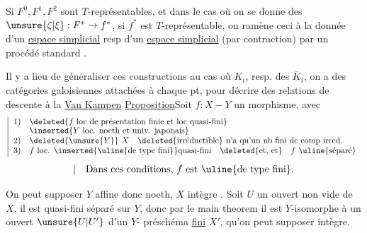 Si $F^0,F^1,F^2$ sont $T$-représentables, et dans le cas où on se donne
des $\unsure{\zeta|\xi}:F^*\to f^*$, si $f^*$ est $T$-représentable,
on ramène ceci à la donnée d'un  \uline{espace simplicial}
resp d'un \uline{espace simplicial}  (par contraction)
par un procédé standard \unsure{----}.

Il y a lieu de généraliser ces constructions au cas où
 $K_i$, resp. des $\overline K_i$, on a des catégories
galoisiennes attachées à chaque pt,
pour décrire des relations de descente à la
\uline{Van Kampen} \unsure{-----}
\uline{Proposition}\quad Soit $f:X-Y$ un morphisme, avec
\[
\left|
\begin{array}{ll}
1)&\deleted{f\text{ loc de présentation finie et loc quasi-fini}}\\[-.3ex]
 &\inserted{Y\text{ loc. noeth et univ. japonais}}\\
2)&\deleted{\unsure{Y}}\ X\quad\deleted{\text{irréductible}}\ 
\text{n'a qu'un nb fini de comp irred.}\\
3)&f\text{ loc. }\inserted{\uline{\text{de type fini}}}
\text{quasi-fini}\quad\deleted{\text{et, et}}\quad f\ \uline{\text{séparé}}
\end{array}
\right.
\]
\[
\left|\quad\text{Dans ces conditions, }f\text{ est \uline{de type fini}.}\right.
\]

On peut supposer $Y$ affine donc noeth, \unsure{\&}
$X$ intègre 
.
Soit $U$ un ouvert  non vide de $X$, il est
quasi-fini séparé sur $Y$, donc par le main theorem il est
$Y$-isomorphe à un ouvert $\unsure{U|U'}$ d'un $Y$-
préschéma \uline{fini} $X'$, qu'on peut supposer intègre.


